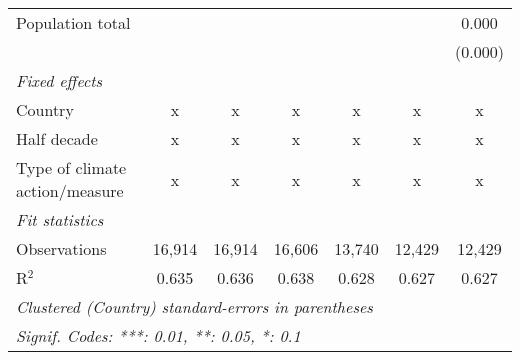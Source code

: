 \begin{tabular}{lcccccc}
   Population total                                            &               &                &                &                &                & 0.000\\   
                                                               &               &                &                &                &                & (0.000)\\   
   \emph{Fixed effects}\\
   Country                                                     & x             & x              & x              & x              & x              & x\\  
   Half decade                                                 & x             & x              & x              & x              & x              & x\\  
   Type of climate action/measure                              & x             & x              & x              & x              & x              & x\\  
   \midrule \emph{Fit statistics}\\
   Observations                                                & 16,914        & 16,914         & 16,606         & 13,740         & 12,429         & 12,429\\  
   R$^2$                                                       & 0.635         & 0.636          & 0.638          & 0.628          & 0.627          & 0.627\\  
   \midrule
   \multicolumn{7}{l}{\emph{Clustered (Country) standard-errors in parentheses}}\\
   \multicolumn{7}{l}{\emph{Signif. Codes: ***: 0.01, **: 0.05, *: 0.1}}\\
\end{tabular}
\par\endgroup


